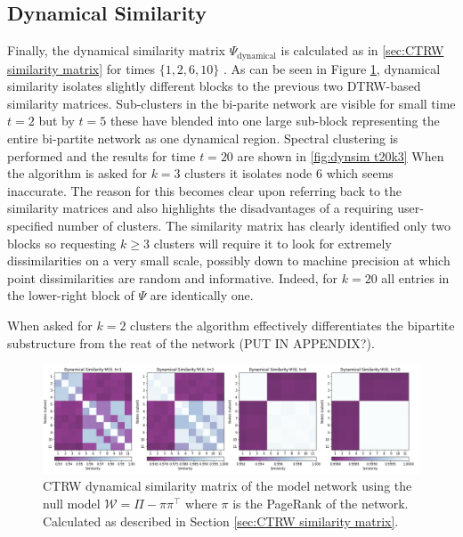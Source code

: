 \documentclass[12pt,a4paper]{article}
\begin{document}
\subsection{Dynamical Similarity}
Finally, the dynamical similarity matrix $\Psi_{\text{dynamical}}$ is calculated as in \ref{sec:CTRW similarity matrix} for times $\{ 1,2,6,10 \}$ . As can be seen in Figure \ref{fig:dynamical similarity matrix toy}, dynamical similarity isolates slightly different blocks to the previous two DTRW-based similarity matrices. Sub-clusters in the bi-parite network are visible for small time $t=2$ but by $t=5$ these have blended into one large sub-block representing the entire bi-partite network as one dynamical region. Spectral clustering is performed and the results for time $t=20$ are shown in \ref{fig:dynsim t20k3} When the algorithm is asked for $k=3$ clusters it isolates node $6$ which seems inaccurate. The reason for this becomes clear upon referring back to the similarity matrices and also highlights the disadvantages of a requiring user-specified number of clusters. The similarity matrix has clearly identified only two blocks so requesting $k\geq3$ clusters will require it to look for extremely dissimilarities on a very small scale, possibly down to machine precision at which point dissimilarities are random and informative. Indeed, for $k=20$ all entries in the lower-right block of $\Psi$ are identically one. \medskip

\noindent When asked for $k=2$ clusters the algorithm effectively differentiates the bipartite substructure from the reat of the network (PUT IN APPENDIX?).
\begin{figure}[H]
    \centering
    \includegraphics[width=\textwidth]{toy_net/Dynamical_Similarity_toy_net.png}
    \caption{CTRW dynamical similarity matrix of the model network using the null model $\mathcal W = \Pi - \pi \pi^\top $ where $\pi$ is the PageRank of the network. Calculated as described in Section \ref{sec:CTRW similarity matrix}.}
    \label{fig:dynamical similarity matrix toy}
\end{figure}
\end{document}
